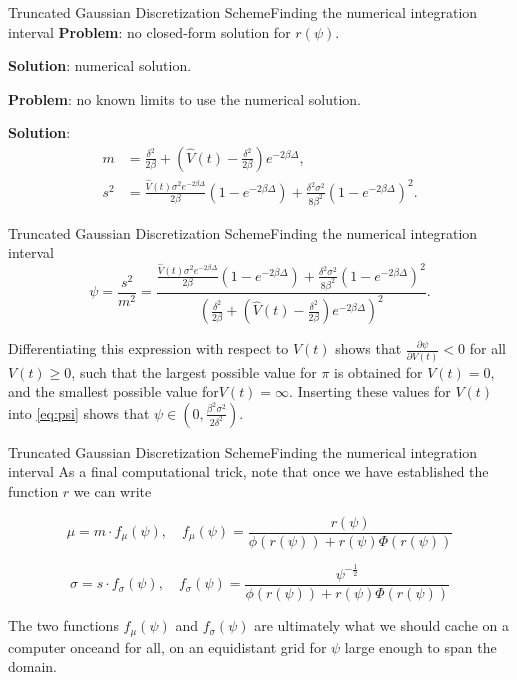     \begin{frame}{Truncated Gaussian Discretization Scheme}{Finding the numerical integration interval}
        \textbf{Problem}: no closed-form solution for $r(\psi)$. 
        
        \textbf{Solution}: numerical solution.

        \textbf{Problem}: no known limits to use the numerical solution.

        \textbf{Solution}: 
        \begin{align}
            m   &= \frac{\delta^2}{2\beta} + \left(\hat{V}(t) - \frac{\delta^2}{2\beta}\right)e^{-2\beta \Delta},\\
            s^2 &= \frac{\hat{V}(t)\sigma^2e^{-2\beta \Delta}}{2\beta}\left(1 - e^{-2\beta \Delta}\right) + \frac{\delta^2\sigma^2}{8\beta^2}\left(1 - e^{-2\beta \Delta}\right)^2.
        \end{align}
    \end{frame}

    \begin{frame}{Truncated Gaussian Discretization Scheme}{Finding the numerical integration interval}
        \begin{equation}\label{eq:psi}
            \psi = \frac{s^2}{m^2} = \frac{\frac{\hat{V}(t)\sigma^2e^{-2\beta \Delta}}{2\beta}\left(1 - e^{-2\beta \Delta}\right) + \frac{\delta^2\sigma^2}{8\beta^2}\left(1 - e^{-2\beta \Delta}\right)^2}{(\frac{\delta^2}{2\beta} + \left(\hat{V}(t) - \frac{\delta^2}{2\beta}\right)e^{-2\beta \Delta})^2}.
        \end{equation}

        Differentiating this expression with respect to $V(t)$ shows that $\frac{\partial\psi}{\partial V(t)}<0$ for all $V(t)\geq 0$, such that the largest possible value for $\pi$ is 
        obtained for $V(t)=0$, and the smallest possible value for$V(t)=\infty$. Inserting these values for $V(t)$ into \eqref{eq:psi} shows that $\psi \in (0, \frac{\beta^2\sigma^2}{2\delta^2})$.
    \end{frame}

    \begin{frame}{Truncated Gaussian Discretization Scheme}{Finding the numerical integration interval}
        As a final computational trick, note that once we have established the function $r$ we can write
        
        \begin{equation}
        \mu = m\cdot f_\mu(\psi), \quad f_\mu(\psi)= \frac{r(\psi)}{\phi(r(\psi)) + r(\psi)\Phi(r(\psi))}
        \end{equation}

        \begin{equation}
        \sigma = s\cdot f_\sigma(\psi), \quad f_\sigma(\psi)= \frac{\psi^{-\frac{1}{2}}}{\phi(r(\psi)) + r(\psi)\Phi(r(\psi))}
        \end{equation}

        The two functions $f_\mu(\psi)$ and $f_\sigma(\psi)$ are ultimately what we should cache on a computer onceand for all, on an equidistant grid for $\psi$ large enough to span the domain.
    \end{frame}
